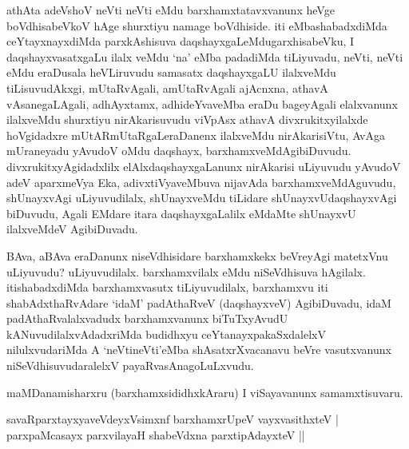 \begin{center}
\end{center}

\centerline{}

\begin{artha}
athAta adeVshoV neVti neVti eMdu barxhamxtatavxvanunx heVge
boVdhisabeVkoV hAge shurxtiyu namage boVdhiside. iti eMbashabadxdiMda
ceYtayxnayxdiMda parxkAshisuva daqshayxgaLeMdugarxhisabeVku, I
daqshayxvasatxgaLu ilalx veMdu `na' eMba padadiMda  tiLiyuvadu, neVti,
neVti eMdu eraDusala heVLiruvudu samasatx daqshayxgaLU ilalxveMdu
tiLisuvudAkxgi, mUtaRvAgali, amUtaRvAgali ajAcnxna, athavA
vAsanegaLAgali, adhAyxtamx, adhideYvaveMba eraDu bageyAgali
elalxvanunx ilalxveMdu shurxtiyu nirAkarisuvudu viVpAsx athavA
divxrukitxyilalxde hoVgidadxre mUtARmUtaRgaLeraDanenx ilalxveMdu
nirAkarisiVtu, AvAga mUraneyadu yAvudoV oMdu daqshayx,
barxhamxveMdAgibiDuvudu. divxrukitxyAgidadxlilx elAlxdaqshayxgaLanunx
nirAkarisi uLiyuvudu yAvudoV adeV aparxmeVya Eka, adivxtiVyaveMbuva
nijavAda barxhamxveMdAguvudu, shUnayxvAgi uLiyuvudilalx, shUnayxveMdu
tiLidare shUnayxvUdaqshayxvAgi biDuvudu, Agali EMdare itara
daqshayxgaLalilx eMdaMte shUnayxvU ilalxveMdeV AgibiDuvadu.

BAva, aBAva eraDanunx niseVdhisidare barxhamxkekx beVreyAgi matetxVnu
uLiyuvudu? uLiyuvudilalx. barxhamxvilalx eMdu niSeVdhisuva
hAgilalx. itishabadxdiMda barxhamxvasutx tiLiyuvudilalx, barxhamxvu
iti shabAdxthaRvAdare `idaM' padAthaRveV (daqshayxveV) AgibiDuvadu,
idaM padAthaRvalalxvadudx barxhamxvanunx biTuTxyAvudU
kANuvudilalxvAdadxriMda budidhxyu ceYtanayxpakaSxdalelxV nilulxvudariMda A
`neVtineVti'eMba shAsatxrXvacanavu beVre vasutxvanunx
niSeVdhisuvudaralelxV payaRvasAnagoLuLxvudu.

maMDanamisharxru (barxhamxsididhxkAraru) I viSayavanunx
samamxtisuvaru. 
\end{artha}

\begin{shl}
savaRparxtayxyaveVdeyxV\s simxnf barxhamxrUpeV vayxvasithxteV |
parxpaMcasayx parxvilayaH shabeVdxna parxtipAdayxteV ||
\end{shl}

